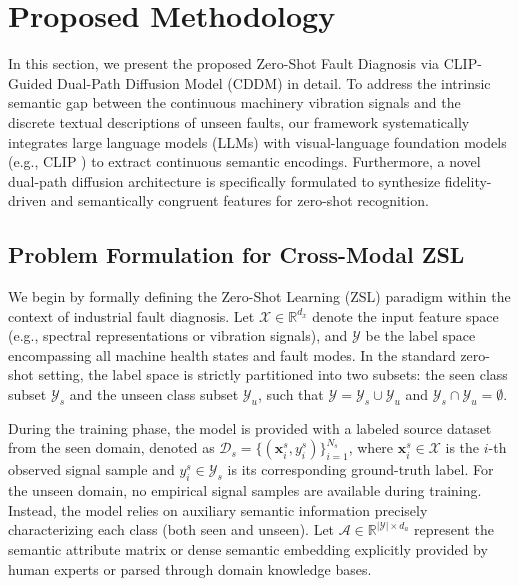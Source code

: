 \section{Proposed Methodology}
\label{sec:methodology}

In this section, we present the proposed Zero-Shot Fault Diagnosis via CLIP-Guided Dual-Path Diffusion Model (CDDM) in detail. To address the intrinsic semantic gap between the continuous machinery vibration signals and the discrete textual descriptions of unseen faults, our framework systematically integrates large language models (LLMs) with visual-language foundation models (e.g., CLIP \cite{radford2021learning}) to extract continuous semantic encodings. Furthermore, a novel dual-path diffusion architecture is specifically formulated to synthesize fidelity-driven and semantically congruent features for zero-shot recognition. 

\subsection{Problem Formulation for Cross-Modal ZSL}
\label{subsec:problem_formulation}

We begin by formally defining the Zero-Shot Learning (ZSL) paradigm within the context of industrial fault diagnosis. Let $\mathcal{X} \in \mathbb{R}^{d_x}$ denote the input feature space (e.g., spectral \cite{smith2011scientist} representations or vibration signals), and $\mathcal{Y}$ be the label space encompassing all machine health states and fault modes. In the standard zero-shot setting, the label space is strictly partitioned into two subsets: the seen class subset $\mathcal{Y}_s$ and the unseen class subset $\mathcal{Y}_u$, such that $\mathcal{Y} = \mathcal{Y}_s \cup \mathcal{Y}_u$ and $\mathcal{Y}_s \cap \mathcal{Y}_u = \emptyset$.

During the training phase, the model is provided with a labeled source dataset from the seen domain, denoted as $\mathcal{D}_s = \{(\mathbf{x}_i^s, y_i^s)\}_{i=1}^{N_s}$, where $\mathbf{x}_i^s \in \mathcal{X}$ is the $i$-th observed signal sample and $y_i^s \in \mathcal{Y}_s$ is its corresponding ground-truth label. For the unseen domain, no empirical signal samples are available during training. Instead, the model relies on auxiliary semantic information precisely characterizing each class (both seen and unseen). Let $\mathcal{A} \in \mathbb{R}^{|\mathcal{Y}| \times d_a}$ represent the semantic attribute matrix or dense semantic embedding \cite{mikolov2013efficient} explicitly provided by human experts or parsed through domain knowledge bases. 

